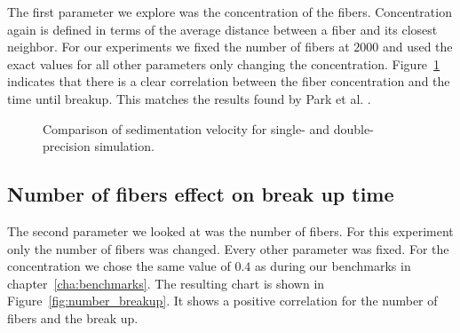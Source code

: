 \documentclass[a4paper,11pt]{kth-mag}
\begin{document}
The first parameter we explore was the concentration of the fibers. Concentration again is defined in terms of the average distance between a fiber and its closest neighbor. For our experiments we fixed the number of fibers at $2000$ and used the exact values for all other parameters only changing the concentration. Figure~\ref{fig:concentration_breakup} indicates that there is a clear correlation between the fiber concentration and the time until breakup. This matches the results found by Park et al. \cite{Park2010}.

\begin{figure}[!htbp]
  \centering
  \caption{Comparison of sedimentation velocity for single- and double-precision simulation.}
  \label{fig:concentration_breakup}
\end{figure}

\subsection{Number of fibers effect on break up time}

The second parameter we looked at was the number of fibers. For this experiment only the number of fibers was changed. Every other parameter was fixed. For the concentration we chose the same value of $0.4$ as during our benchmarks in chapter~\ref{cha:benchmarks}. The resulting chart is shown in Figure~\ref{fig:number_breakup}. It shows a positive correlation for the number of fibers and the break up.
\end{document}
